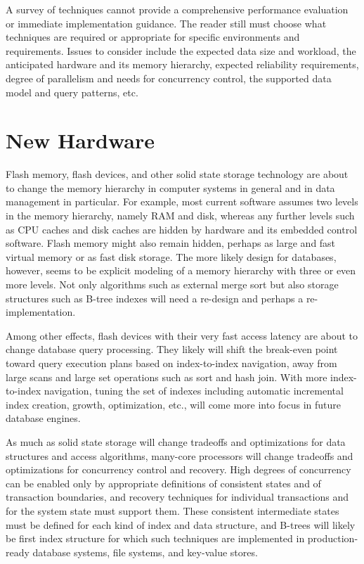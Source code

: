 A survey of techniques cannot provide a comprehensive performance
evaluation or immediate implementation guidance. The reader still must
choose what techniques are required or appropriate for specific
environments and requirements. Issues to consider include the expected
data size and workload, the anticipated hardware and its memory
hierarchy, expected reliability requirements, degree of parallelism and
needs for concurrency control, the supported data model and query
patterns, etc.

\hypertarget{new-hardware}{%
\section{New Hardware}\label{new-hardware}}

Flash memory, flash devices, and other solid state storage technology
are about to change the memory hierarchy in computer systems in general
and in data management in particular. For example, most current software
assumes two levels in the memory hierarchy, namely RAM and disk, whereas
any further levels such as CPU caches and disk caches are hidden by
hardware and its embedded control software. Flash memory might also
remain hidden, perhaps as large and fast virtual memory or as fast disk
storage. The more likely design for databases, however, seems to be
explicit modeling of a memory hierarchy with three or even more levels.
Not only algorithms such as external merge sort but also storage
structures such as B-tree indexes will need a re-design and perhaps a
re-implementation.

Among other effects, flash devices with their very fast access latency
are about to change database query processing. They likely will shift
the break-even point toward query execution plans based on
index-to-index navigation, away from large scans and large set
operations such as sort and hash join. With more index-to-index
navigation, tuning the set of indexes including automatic incremental
index creation, growth, optimization, etc., will come more into focus in
future database engines.

As much as solid state storage will change tradeoffs and optimizations
for data structures and access algorithms, many-core processors will
change tradeoffs and optimizations for concurrency control and recovery.
High degrees of concurrency can be enabled only by appropriate
definitions of consistent states and of transaction boundaries, and
recovery techniques for individual transactions and for the system state
must support them. These consistent intermediate states must be defined
for each kind of index and data structure, and B-trees will likely be
first index structure for which such techniques are implemented in
production-ready database systems, file systems, and key-value stores.

